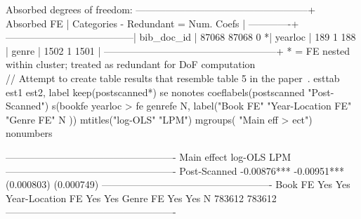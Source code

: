 {Absorbed degrees of freedom:
-----------------------------------------------------+
 Absorbed FE | Categories  - Redundant  = Num. Coefs |
-------------+---------------------------------------|
  bib_doc_id |     87068       87068           0    *|
     yearloc |       189           1         188     |
       genre |      1502           1        1501     |
-----------------------------------------------------+
* = FE nested within cluster; treated as redundant for DoF computation
\\
// Attempt to create table results that resemble table 5 in the paper\
. esttab est1 est2, label keep(postscanned*) se nonotes coeflabels(postscanned "Post-Scanned") s(bookfe yearloc
> fe genrefe N, label("Book FE" "Year-Location FE" "Genre FE" N )) mtitles("log-OLS"  "LPM") mgroups( "Main eff
> ect") nonumbers

----------------------------------------------------
                      Main effect                   
                          log-OLS             LPM   
----------------------------------------------------
Post-Scanned             -0.00876***     -0.00951***
                       (0.000803)      (0.000749)   
----------------------------------------------------
Book FE                       Yes             Yes   
Year-Location FE              Yes             Yes   
Genre FE                      Yes             Yes   
N                          783612          783612   
----------------------------------------------------

}